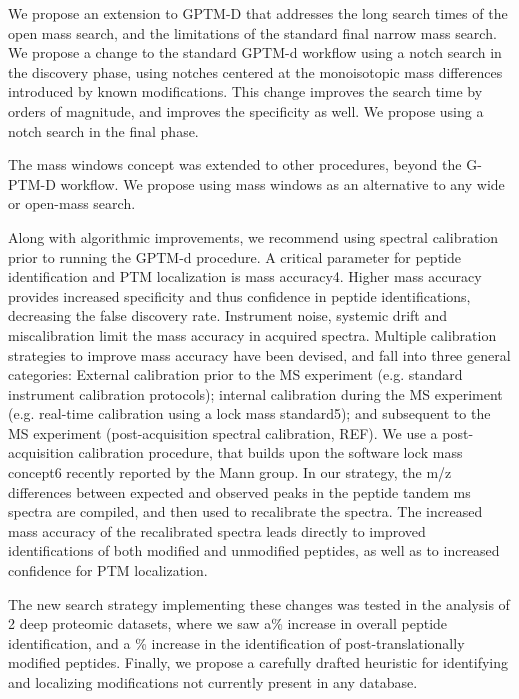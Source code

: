 \documentclass[journal=jprobs,manuscript=article]{achemso}
\begin{document}
We propose an extension to GPTM-D that addresses the long search times of the open mass search, and the limitations of the standard final narrow mass search. We propose a change to the standard GPTM-d workflow using a notch search in the discovery phase, using notches centered at the monoisotopic mass differences introduced by known modifications. This change improves the search time by orders of magnitude, and improves the specificity as well. We propose using a notch search in the final phase.

The mass windows concept was extended to other procedures, beyond the G-PTM-D workflow. We propose using mass windows as an alternative to any wide or open-mass search. 

Along with algorithmic improvements, we recommend using spectral calibration prior to running the GPTM-d procedure. A critical parameter for peptide identification and PTM localization is mass accuracy4. Higher mass accuracy provides increased specificity and thus confidence in peptide identifications, decreasing the false discovery rate.  Instrument noise, systemic drift and miscalibration limit the mass accuracy in acquired spectra.  Multiple calibration strategies to improve mass accuracy have been devised, and fall into three general categories:  External calibration prior to the MS experiment (e.g. standard instrument calibration protocols); internal calibration during the MS experiment (e.g. real-time calibration using a lock mass standard5); and subsequent to the MS experiment (post-acquisition spectral calibration, REF).  We use a post-acquisition calibration procedure, that builds upon the software lock mass concept6 recently reported by the Mann group.  In our strategy, the m/z differences between expected and observed peaks in the peptide tandem ms spectra are compiled, and then used to recalibrate the spectra.  The increased mass accuracy of the recalibrated spectra leads directly to improved identifications of both modified and unmodified peptides, as well as to increased confidence for PTM localization.

The new search strategy implementing these changes was tested in the analysis of 2 deep proteomic datasets, where we saw a\% increase in overall peptide identification, and a \% increase in the identification of post-translationally modified peptides.
Finally, we propose a carefully drafted heuristic for identifying and localizing modifications not currently present in any database.
\end{document}
